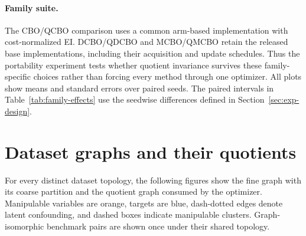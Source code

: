 \documentclass[twoside]{article}
\begin{document}
\begin{table}[H]
  \centering
  \caption{Controlled misspecifications and measured paired trajectory
  deviations. Rows whose quotient is unchanged are predicted invariant by
  Proposition~\ref{prop:contract}.}
  \label{tab:minimal-taxonomy}
  \small
\end{table}

\paragraph{Family suite.}
The CBO/QCBO comparison uses a common arm-based implementation with
cost-normalized EI. DCBO/QDCBO and MCBO/QMCBO retain the released base
implementations, including their acquisition and update schedules. Thus the
portability experiment tests whether quotient invariance survives these
family-specific choices rather than forcing every method through one
optimizer. All plots show means and standard errors over paired seeds. The
paired intervals in Table~\ref{tab:family-effects} use the seedwise
differences defined in Section~\ref{sec:exp-design}.

\section{Dataset graphs and their quotients}
\label{app:dags}

For every distinct dataset topology, the following figures show the fine
graph with its coarse partition and the quotient graph consumed by the
optimizer. Manipulable variables are orange, targets are blue, dash-dotted
edges denote latent confounding, and dashed boxes indicate manipulable
clusters. Graph-isomorphic benchmark pairs are shown once under their shared
topology.

\begingroup
\let\savedfigure\figure
\let\endsavedfigure\endfigure
\renewenvironment{figure}[1][]{\savedfigure[H]}{\endsavedfigure}

\endgroup
\clearpage
\end{document}
